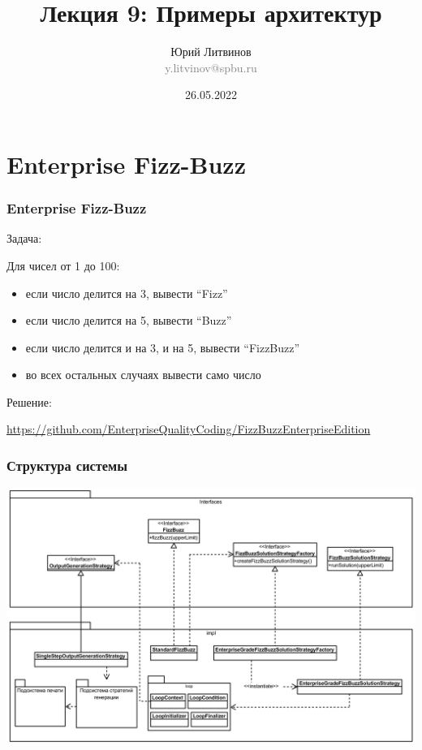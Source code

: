 \documentclass[xetex,mathserif,serif]{beamer}
\title{Лекция 9: Примеры архитектур}
\author[Юрий Литвинов]{Юрий Литвинов\\\small{\textcolor{gray}{y.litvinov@spbu.ru}}}
\date{26.05.2022}
\begin{document}
    \frame{\titlepage}
    \section{Enterprise Fizz-Buzz}

    \begin{frame}
        \frametitle{Enterprise Fizz-Buzz}
        Задача:

        Для чисел от 1 до 100:
        \begin{itemize}
            \item если число делится на 3, вывести ``Fizz''
            \item если число делится на 5, вывести ``Buzz''
            \item если число делится и на 3, и на 5, вывести ``FizzBuzz''
            \item во всех остальных случаях вывести само число
        \end{itemize}

        Решение:

        \url{https://github.com/EnterpriseQualityCoding/FizzBuzzEnterpriseEdition}
    \end{frame}

    \begin{frame}
        \frametitle{Структура системы}
        \begin{center}
            \includegraphics[width=\textwidth]{fizzBuzzArchitecture.png}
        \end{center}
    \end{frame}
\end{document}
